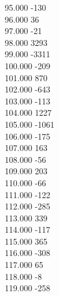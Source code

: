 { 95.000	-130 \\
 96.000	36 \\
 97.000	-21 \\
 98.000	3293 \\
 99.000	-3311 \\
 100.000	-209 \\
 101.000	870 \\
 102.000	-643 \\
 103.000	-113 \\
 104.000	1227 \\
 105.000	-1061 \\
 106.000	-175 \\
 107.000	163 \\
 108.000	-56 \\
 109.000	203 \\
 110.000	-66 \\
 111.000	-122 \\
 112.000	-285 \\
 113.000	339 \\
 114.000	-117 \\
 115.000	365 \\
 116.000	-308 \\
 117.000	65 \\
 118.000	-8 \\
 119.000	-258 \\
}
